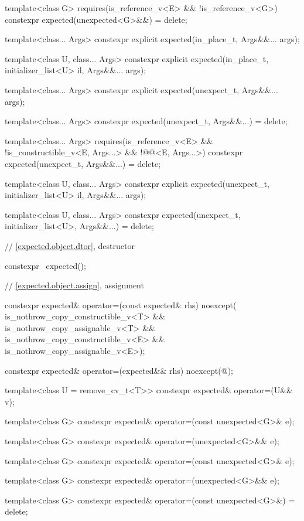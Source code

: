 \begin{codeblock}
{{    template<class G>
      requires(is_reference_v<E> && !is_reference_v<G>)
    constexpr expected(unexpected<G>&&) = delete;

    template<class... Args> constexpr explicit expected(in_place_t, Args&&... args);

    template<class U, class... Args>
    constexpr explicit expected(in_place_t, initializer_list<U> il, Args&&... args);

    template<class... Args> constexpr explicit expected(unexpect_t, Args&&... args);

    template<class... Args> constexpr expected(unexpect_t, Args&&...) = delete;

    template<class... Args>
      requires(is_reference_v<E> && !is_constructible_v<E, Args...> &&
               !@@<E, Args...>)
    constexpr expected(unexpect_t, Args&&...) = delete;

    template<class U, class... Args>
    constexpr explicit expected(unexpect_t, initializer_list<U> il, Args&&... args);

    template<class U, class... Args>
    constexpr expected(unexpect_t, initializer_list<U>, Args&&...) = delete;

    // \ref{expected.object.dtor}, destructor

    constexpr ~expected();

    // \ref{expected.object.assign}, assignment

    constexpr expected& operator=(const expected& rhs) noexcept(
        is_nothrow_copy_constructible_v<T> && is_nothrow_copy_assignable_v<T> &&
        is_nothrow_copy_constructible_v<E> && is_nothrow_copy_assignable_v<E>);

    constexpr expected& operator=(expected&& rhs) noexcept(@\seebelow@);

    template<class U = remove_cv_t<T>> constexpr expected& operator=(U&& v);

    template<class G> constexpr expected& operator=(const unexpected<G>& e);

    template<class G> constexpr expected& operator=(unexpected<G>&& e);

    template<class G> constexpr expected& operator=(const unexpected<G>& e);

    template<class G> constexpr expected& operator=(unexpected<G>&& e);

    template<class G> constexpr expected& operator=(const unexpected<G>&) = delete;

}}
\end{codeblock}

